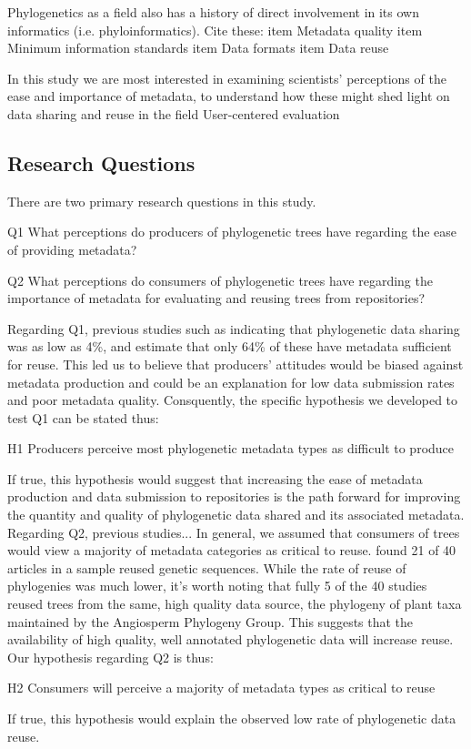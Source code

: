 \documentclass[12pt]{scrartcl}
\begin{document}
\begin{multicols}{2}
Phylogenetics as a field also has a history of direct involvement in its own informatics (i.e. phyloinformatics). %
Cite these:
	item Metadata quality
	item Minimum information standards \citep{Leebens-Mack2006}
	item Data formats \citep{Vos2012}
	item Data reuse \citep{Stoltzfus2012}

In this study we are most interested in examining scientists' perceptions of the ease and importance of metadata, to understand how these might shed light on data sharing and reuse in the field
User-centered evaluation

\subsection{Research Questions}
There are two primary research questions in this study.  
\begin{compactitem}
	\item[Q1] What perceptions do producers of phylogenetic trees have regarding the ease of providing metadata?
	\item[Q2] What perceptions do consumers of phylogenetic trees have regarding the importance of metadata for evaluating and reusing trees from repositories?
\end{compactitem}
Regarding Q1, previous studies such as \citet{Stoltzfus2012} indicating that phylogenetic data sharing was as low as 4\%, and \citet{Drew2013} estimate that only 64\% of these have metadata sufficient for reuse. This led us to believe that producers' attitudes would be biased against metadata production and could be an explanation for low data submission rates and poor metadata quality.  Consquently, the specific hypothesis we developed to test Q1 can be stated thus:
\begin{compactitem}
	\item[H1] Producers perceive most phylogenetic metadata types as difficult to produce
\end{compactitem}
If true, this hypothesis would suggest that increasing the ease of metadata production and data submission to repositories is the path forward for improving the quantity and quality of phylogenetic data shared and its associated metadata.
Regarding Q2, previous studies...%
In general, we assumed that consumers of trees would view a majority of metadata categories as critical to reuse.  \citet{Stoltzfus2012} found 21 of 40 articles in a sample reused genetic sequences.  While the rate of reuse of phylogenies was much lower, it's worth noting that fully 5 of the 40 studies reused trees from the same, high quality data source, the phylogeny of plant taxa maintained by the Angiosperm Phylogeny Group. %
This suggests that the availability of high quality, well annotated phylogenetic data will increase reuse.  Our hypothesis regarding Q2 is thus:
\begin{compactitem}
	\item[H2] Consumers will perceive a majority of metadata types as critical to reuse
\end{compactitem}
If true, this hypothesis would explain the observed low rate of phylogenetic data reuse.


\end{multicols}
\end{document}
